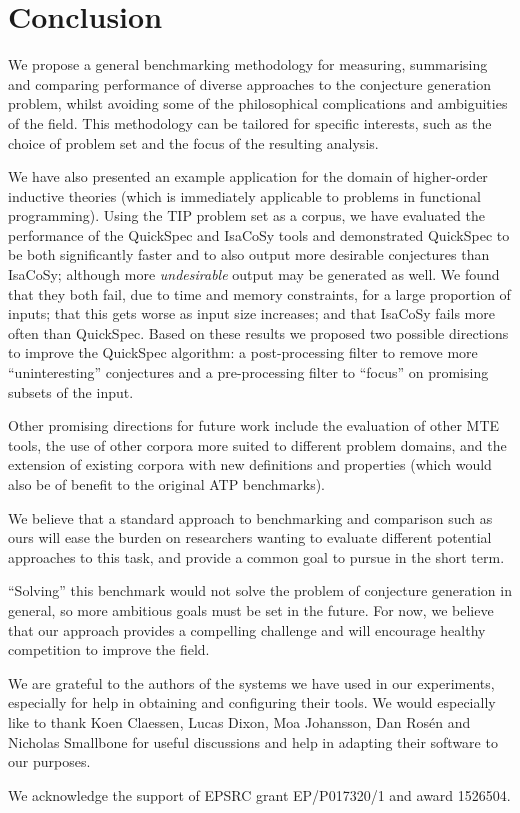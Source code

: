 \section{Conclusion}
\label{sec:conclusion}

We propose a general benchmarking methodology for measuring, summarising and
comparing performance of diverse approaches to the conjecture generation
problem, whilst avoiding some of the philosophical complications and ambiguities
of the field. This methodology can be tailored for specific interests, such as
the choice of problem set and the focus of the resulting analysis.

We have also presented an example application for the domain of higher-order
inductive theories (which is immediately applicable to problems in functional
programming). Using the TIP problem set as a corpus, we have evaluated the
performance of the QuickSpec and IsaCoSy tools and demonstrated QuickSpec to be
both significantly faster and to also output more desirable conjectures than
IsaCoSy; although more \emph{undesirable} output may be generated as well. We
found that they both fail, due to time and memory constraints, for a large
proportion of inputs; that this gets worse as input size increases; and that
IsaCoSy fails more often than QuickSpec. Based on these results we proposed two
possible directions to improve the QuickSpec algorithm: a post-processing filter
to remove more ``uninteresting'' conjectures and a pre-processing filter to
``focus'' on promising subsets of the input.

Other promising directions for future work include the evaluation of other MTE
tools, the use of other corpora more suited to different problem domains, and
the extension of existing corpora with new definitions and properties (which
would also be of benefit to the original ATP benchmarks).

We believe that a standard approach to benchmarking and comparison such as ours
will ease the burden on researchers wanting to evaluate different potential
approaches to this task, and provide a common goal to pursue in the short term.

``Solving'' this benchmark would not solve the problem of conjecture generation
in general, so more ambitious goals must be set in the future. For now, we
believe that our approach provides a compelling challenge and will encourage
healthy competition to improve the field.

\begin{acknowledgements}
  We are grateful to the authors of the systems we have used in our experiments,
  especially for help in obtaining and configuring their tools. We would
  especially like to thank Koen Claessen, Lucas Dixon, Moa Johansson, Dan
  Ros\'{e}n and Nicholas Smallbone for useful discussions and help in adapting
  their software to our purposes.

  We acknowledge the support of EPSRC grant EP/P017320/1 and award 1526504.
\end{acknowledgements}





